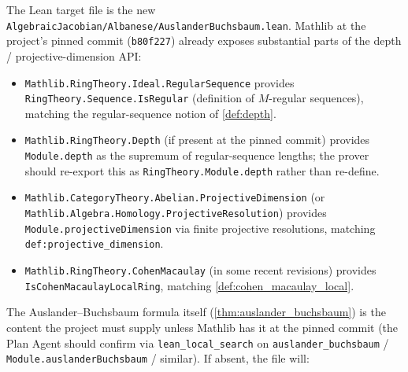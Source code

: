 The Lean target file is the new \texttt{AlgebraicJacobian/Albanese/AuslanderBuchsbaum.lean}.
Mathlib at the project's pinned commit (\texttt{b80f227}) already exposes substantial parts
of the depth / projective-dimension API:
\begin{itemize}
  \item \texttt{Mathlib.RingTheory.Ideal.RegularSequence} provides
    \texttt{RingTheory.Sequence.IsRegular} (definition of \(M\)-regular sequences),
    matching the regular-sequence notion of \cref{def:depth}.
  \item \texttt{Mathlib.RingTheory.Depth} (if present at the pinned commit) provides
    \texttt{Module.depth} as the supremum of regular-sequence lengths; the prover
    should re-export this as \texttt{RingTheory.Module.depth} rather than re-define.
  \item \texttt{Mathlib.CategoryTheory.Abelian.ProjectiveDimension} (or
    \texttt{Mathlib.Algebra.Homology.ProjectiveResolution}) provides
    \texttt{Module.projectiveDimension} via finite projective resolutions, matching
    \texttt{def:projective_dimension}.
  \item \texttt{Mathlib.RingTheory.CohenMacaulay} (in some recent revisions) provides
    \texttt{IsCohenMacaulayLocalRing}, matching \cref{def:cohen_macaulay_local}.
\end{itemize}
The Auslander--Buchsbaum formula itself (\cref{thm:auslander_buchsbaum}) is the
content the project must supply unless Mathlib has it at the pinned commit (the Plan Agent
should confirm via \texttt{lean\_local\_search} on \texttt{auslander\_buchsbaum} /
\texttt{Module.auslanderBuchsbaum} / similar). If absent, the file will:
